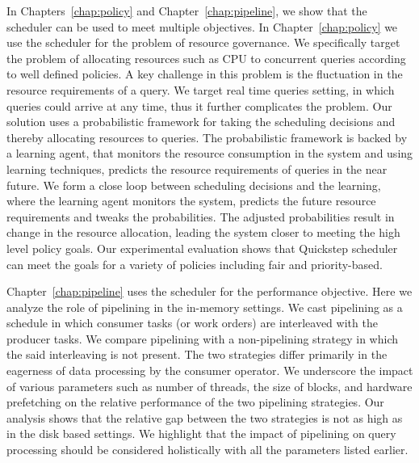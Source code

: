In Chapters~\ref{chap:policy} and Chapter~\ref{chap:pipeline}, we show that the scheduler can be used to meet multiple objectives.
In Chapter~\ref{chap:policy} we use the scheduler for the problem of resource governance.
We specifically target the problem of allocating resources such as CPU to concurrent queries according to well defined policies.
A key challenge in this problem is the fluctuation in the resource requirements of a query.
We target real time queries setting, in which queries could arrive at any time, thus it further complicates the problem.
Our solution uses a probabilistic framework for taking the scheduling decisions and thereby allocating resources to queries.
The probabilistic framework is backed by a learning agent, that monitors the resource consumption in the system and using learning techniques, predicts the resource requirements of queries in the near future.  
We form a close loop between scheduling decisions and the learning, where the learning agent monitors the system, predicts the future resource requirements and tweaks the probabilities. 
The adjusted probabilities result in change in the resource allocation, leading the system closer to meeting the high level policy goals.
Our experimental evaluation shows that Quickstep scheduler can meet the goals for a variety of policies including fair and priority-based. 

Chapter~\ref{chap:pipeline} uses the scheduler for the performance objective.
Here we analyze the role of pipelining in the in-memory settings. 
We cast pipelining as a schedule in which consumer tasks (or work orders) are interleaved with the producer tasks. 
We compare pipelining with a non-pipelining strategy in which the said interleaving is not present. 
The two strategies differ primarily in the eagerness of data processing by the consumer operator. 
We underscore the impact of various parameters such as number of threads, the size of blocks, and hardware prefetching on the relative performance of the two pipelining strategies. 
Our analysis shows that the relative gap between the two strategies is not as high as in the disk based settings. 
We highlight that the impact of pipelining on query processing should be considered holistically with all the parameters listed earlier. 

